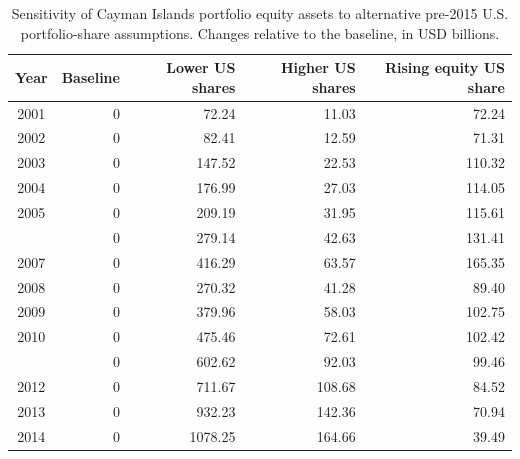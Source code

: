 \begin{table}

\caption{\label{tab:tab:sensitivity_cayman_equity}Sensitivity of Cayman Islands portfolio equity assets to alternative pre-2015 U.S. portfolio-share assumptions. Changes relative to the baseline, in USD billions.}
\centering
\begin{tabular}[t]{crrrr}
\toprule
Year & Baseline & Lower US shares & Higher US shares & Rising equity US share\\
\midrule
2001 & 0 & 72.24 & 11.03 & 72.24\\
2002 & 0 & 82.41 & 12.59 & 71.31\\
2003 & 0 & 147.52 & 22.53 & 110.32\\
2004 & 0 & 176.99 & 27.03 & 114.05\\
2005 & 0 & 209.19 & 31.95 & 115.61\\
\addlinespace
2006 & 0 & 279.14 & 42.63 & 131.41\\
2007 & 0 & 416.29 & 63.57 & 165.35\\
2008 & 0 & 270.32 & 41.28 & 89.40\\
2009 & 0 & 379.96 & 58.03 & 102.75\\
2010 & 0 & 475.46 & 72.61 & 102.42\\
\addlinespace
2011 & 0 & 602.62 & 92.03 & 99.46\\
2012 & 0 & 711.67 & 108.68 & 84.52\\
2013 & 0 & 932.23 & 142.36 & 70.94\\
2014 & 0 & 1078.25 & 164.66 & 39.49\\
\bottomrule
\end{tabular}
\end{table}
